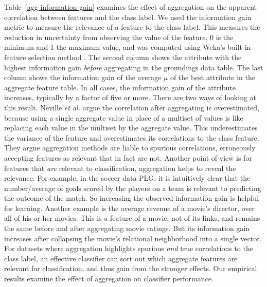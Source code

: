 \documentclass[conference]{IEEEtran}
\begin{document}
Table~\ref{agg-information-gain} examines the effect of aggregation on the apparent correlation between features and the class label. We used the information gain metric to measure the relevance of a feature to the class label. This measures the reduction in uncertainty from observing the value of the feature, 0 is the minimum and 1 the maximum value, and was computed using Weka's built-in feature selection method \cite{Hall2009}. The second column shows the attribute with the highest information gain {\em before} aggregating in the groundings data table. The last column  shows the information gain of the average $\mu$ of the best attribute in the aggregate feature table. In all cases, the information gain of the attribute increases, typically by a factor of five or more. There are two ways of looking at this result. Neville {\em et al.} \cite{Jensen2003,jensen-auto,Neville2003} argue the correlation after aggregating is overestimated, because using a single aggregate value in place of a multiset of values is like replacing each value in the multiset by the aggregate value. This underestimates the variance of the feature and overestimates its correlations to the class feature. They argue aggregation methods are liable to spurious correlations, erroneously accepting features as relevant that in fact are not. Another point of view is for features that {\em are} relevant to classification, aggregation helps to reveal the relevance. For example, in the soccer data PLG, it is intuitively clear that the number/average of goals scored by the players on a team is relevant to predicting the outcome of the match. So increasing the observed information gain is helpful for learning. Another example is the average revenue of a movie's director, over all of his or her movies. This is a feature of a movie, not of its links, and remains the same before and after aggregating movie ratings. But its information gain increases after collapsing the movie's relational neighborhood into a single vector. For datasets where aggregation highlights spurious {\em and} true correlations to the class label, an effective classifier can sort out which aggregate features are relevant for classification, and thus gain from the stronger effects. Our empirical results examine the effect of aggregation on classifier performance.
\end{document}
